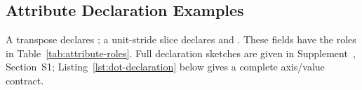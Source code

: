 \subsection{Attribute Declaration Examples}
\label{app:language-declarations}
A transpose declares ; a unit-stride slice declares
 and . These fields have
the roles in Table~\ref{tab:attribute-roles}. Full declaration sketches are
given in Supplement~\cite{tepl-supplement}, Section~S1;
Listing~\ref{lst:dot-declaration} below gives a complete axis/value contract.
